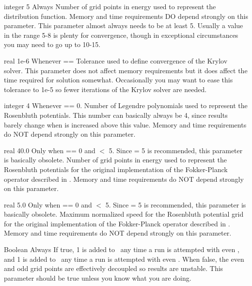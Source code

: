 \myhrule

{integer}
{5}
{Always}
{Number of grid points in energy used to represent the distribution function.
Memory and time requirements DO depend strongly on this parameter.
This parameter almost always needs to be at least 5.
Usually a value in the range 5-8 is plenty for convergence, though in exceptional circumstances
you may need to go up to 10-15.
}

\myhrule

{real}
{1e-6}
{Whenever  == \true}
{
Tolerance used to define convergence of the Krylov solver.
This parameter does not affect memory requirements but it does affect the
time required for solution somewhat.
Occasionally you may want to ease this tolerance to 1e-5 so fewer iterations of the Krylov solver are needed.
}

\myhrule

{integer}
{4}
{Whenever  == 0.}
{Number of Legendre polynomials used to represent the Rosenbluth
potentials. This number can basically always be 4,
since results barely change when  is increased above this value.
Memory and time requirements do NOT depend strongly on this parameter.
}

\myhrule

{real}
{40.0}
{Only when  == 0 and  $<$ 5.
Since  = 5 is recommended, this parameter is basically obsolete.}
{
Number of grid points in energy used to represent the Rosenbluth potentials
for the original implementation of the Fokker-Planck operator described in \cite{speedGrids}.
Memory and time requirements do NOT depend strongly on this parameter.}

\myhrule

{real}
{5.0}
{Only when  == 0 and  $<$ 5.
Since  = 5 is recommended, this parameter is basically obsolete.}
{
Maximum normalized speed for the Rosenbluth potential grid
for the original implementation of the Fokker-Planck operator described in \cite{speedGrids}.
Memory and time requirements do NOT depend strongly on this parameter.}

\myhrule

{Boolean}
{\true}
{Always}
{
If true, 1 is added to \Ntheta~any time a run is attempted with even \Ntheta,
and 1 is added to \Nzeta~any time a run is attempted with even \Nzeta.
When false, the even and odd grid points are effectively decoupled so results are unstable.
This parameter should be true unless you know what you are doing.
}















